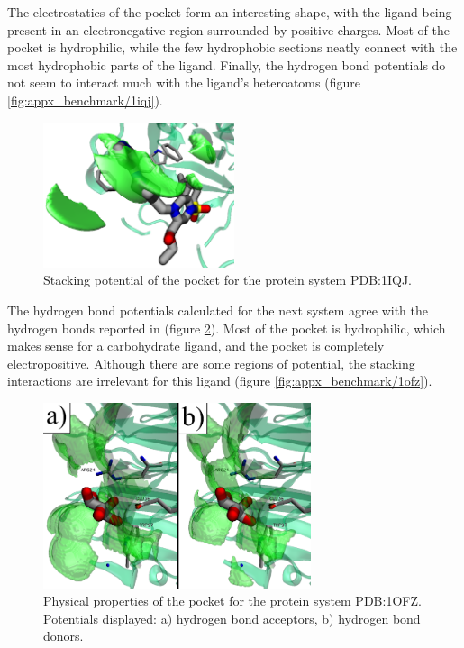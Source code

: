     The electrostatics of the pocket form an interesting shape, with the ligand being present in an electronegative region surrounded by positive charges. Most of the pocket is hydrophilic, while the few hydrophobic sections neatly connect with the most hydrophobic parts of the ligand. Finally, the hydrogen bond potentials do not seem to interact much with the ligand's heteroatoms (figure \ref{fig:appx_benchmark/1iqj}).

    \begin{figure}[H]
      \centering
      \includegraphics[width=0.5\textwidth]{figures/results/benchmark_prot/1iqj.png}
      \caption{\label{fig:benchmark/1iqj} Stacking potential of the pocket for the protein system PDB:1IQJ.}
    \end{figure}

    The hydrogen bond potentials calculated for the next system agree with the hydrogen bonds reported in \cite{hbonds_2023} (figure \ref{fig:benchmark/1ofz}). Most of the pocket is hydrophilic, which makes sense for a carbohydrate ligand, and the pocket is completely electropositive. Although there are some regions of potential, the stacking interactions are irrelevant for this ligand (figure \ref{fig:appx_benchmark/1ofz}).

    \begin{figure}[H]
      \centering
      \includegraphics[width=0.7\textwidth]{figures/results/benchmark_prot/1ofz.png}
      \caption{\label{fig:benchmark/1ofz} Physical properties of the pocket for the protein system PDB:1OFZ. Potentials displayed: a) hydrogen bond acceptors, b) hydrogen bond donors.}
    \end{figure}

